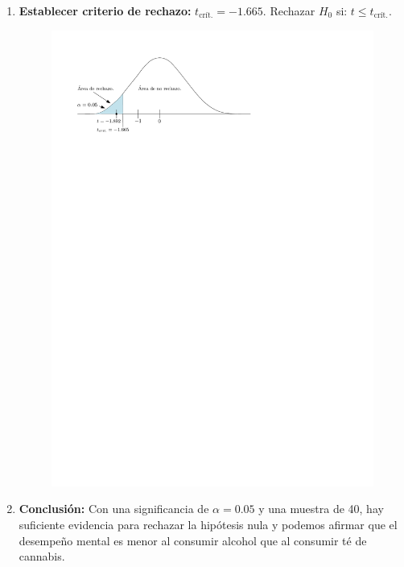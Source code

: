 \documentclass[a4paper]{report}
\begin{document}
\begin{enumerate}
    \item \textbf{Establecer criterio de rechazo:} $\displaystyle t_{\text{crít.}} = -1.665$. Rechazar $H_0$ si: $t \leq t_{\text{crít.}}$.
        \begin{figure}[H]
            \centering
            \includegraphics[width=\textwidth]{onetail.pdf}
        \end{figure}

    \item \textbf{Conclusión:} Con una significancia de $\alpha=0.05$ y una muestra de 40, hay suficiente evidencia para rechazar la hipótesis nula y podemos afirmar que el desempeño mental es menor al consumir alcohol que al consumir té de cannabis.
\end{enumerate}
\end{document}
